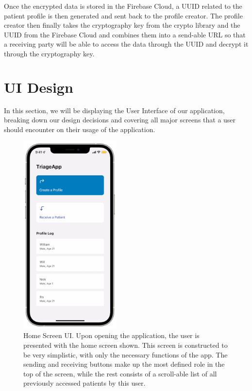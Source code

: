 \documentclass[11pt,letterpaper]{article}
\begin{document}
Once the encrypted data is stored in the Firebase Cloud, a UUID related to the patient profile is then generated and sent back to the profile creator. The profile creator then finally takes the cryptography key from the crypto library and the UUID from the Firebase Cloud and combines them into a send-able URL so that a receiving party will be able to access the data through the UUID and decrypt it through the cryptography key. 

\section{UI Design}
 In this section, we will be displaying the User Interface of our application, breaking down our design decisions and covering all major screens that a user should encounter on their usage of the application. 

\begin{figure}
    \centering
    \includegraphics[width=2in]{Screenshots/hs.png}
    \caption{Home Screen UI. Upon opening the application, the user is presented with the home screen shown. This screen is constructed to be very simplistic, with only the necessary functions of the app. The sending and receiving buttons make up the most defined role in the top of the screen, while the rest consists of a scroll-able list of all previously accessed patients by this user. }
    \label{fig:homescreen}
\end{figure}
\end{document}
